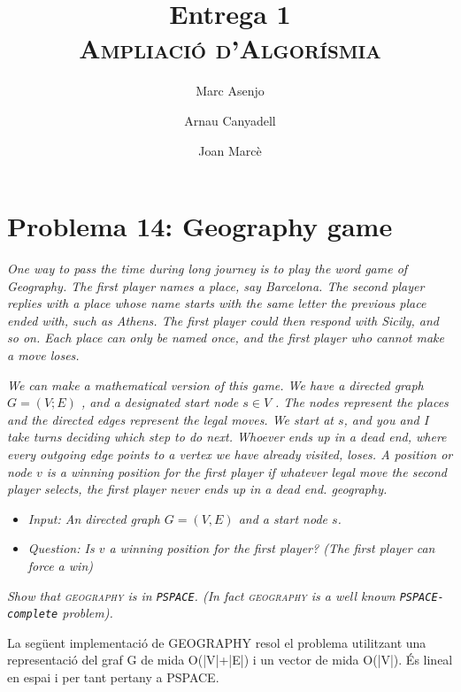 \documentclass[a4paper]{article}
\title{Entrega 1 \\ \textsc{Ampliació d'Algorísmia}}
\author{Marc Asenjo \and Arnau Canyadell \and Joan Marcè}
\date{}
\begin{document}
\maketitle

\section{Problema 14: Geography game}


\emph{One way to pass the time during long journey is to play the word game
of Geography. The first player names a place, say Barcelona. The second player replies
with a place whose name starts with the same letter the previous place ended with, such as
Athens. The first player could then respond with Sicily, and so on. Each place can only be
named once, and the first player who cannot make a move loses.}

\emph{We can make a mathematical version of this game. We have a directed graph $G = (V;E)$ ,
and a designated start node $s \in V$ . The nodes represent the places and the directed edges
represent the legal moves. We start at $s$, and you and I take turns deciding which step to
do next. Whoever ends up in a dead end, where every outgoing edge points to a vertex we
have already visited, loses. A position or node $v$ is a winning position for the first player if
whatever legal move the second player selects, the first player never ends up in a dead end.
geography.}

\begin{itemize}
	\item \emph{Input: An directed graph $G = (V, E)$ and a start node $s$.}
	\item \emph{Question: Is $v$ a winning position for the first player? (The first player can force a win)}
\end{itemize}

\emph{Show that \textsc{geography} is in \texttt{PSPACE}. (In fact \textsc{geography} is a well known \texttt{PSPACE-complete}
problem).}

La següent implementació de GEOGRAPHY resol el problema utilitzant una representació del graf G de mida O(|V|+|E|) i un vector de mida O(|V|). És lineal en espai i per tant pertany a PSPACE.
\end{document}
